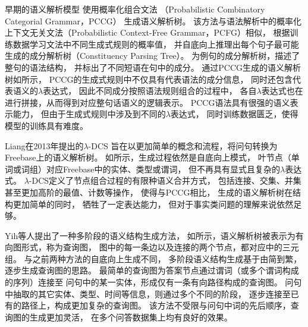早期的语义解析模型\cite{zettlemoyer2012learning,kwiatkowski2010inducing,cai2013large}
使用概率化组合文法  （Probabilistic Combinatory Categorial Grammar，PCCG）
生成语义解析树。
该方法与语法解析中的概率化上下文无关文法（Probabilistic Context-Free Grammar，PCFG）相似，
根据训练数据学习文法中不同生成式规则的概率值，
并自底向上推理出每个句子最可能生成的成分解析树（Constituency Parsing Tree）。
为例句的成分解析树，描述了整句的语法结构，
并标出了不同短语在句中的成分。
通过PCCG生成的语义解析树如所示，
PCCG的生成式规则中不仅具有代表语法的成分信息，
同时还包含代表语义的$\lambda$表达式，
因此不同成分按照语法规则组合的过程中，
各自$\lambda$表达式也在进行拼接，从而得到对应整句话语义的逻辑表示。
PCCG语法具有很强的语义表示能力，
但由于生成式规则中涉及到不同的$\lambda$表达式，
同时训练数据匮乏，使得模型的训练具有难度。

% 


Liang在2013年提出的$\lambda$-DCS\cite{liang2013lambda}
旨在以更加简单的概念和流程，将问句转换为Freebase上的语义解析树。
如所示，生成过程依然是自底向上模式，
叶节点（单词或词组）对应Freebase中的实体、类型或谓词，
但不再具有显式且复杂的$\lambda$表达式。
$\lambda$-DCS定义了节点组合过程的有限种语义合并方式，
包括连接、交集、并集甚至更加高阶的最值、计数等操作，
使得与PCCG相比，
生成的语义解析树在结构更加简单的同时，
牺牲了一定表达能力，
但对于事实类问题的理解来说依然足够。

Yih等人\cite{yih2015semantic}提出了一种多阶段的语义结构生成方法，
如所示，语义解析树被表示为有向图形式，称为查询图，
图中的每一条边以及连接的两个节点，都对应中的三元组。
与之前两种方法的自底向上生成不同，
多阶段语义结构生成基于由简到繁，逐步生成查询图的思路。
最简单的查询图为答案节点通过谓词（或多个谓词构成的序列）连接至
问句中的某一实体，形成仅有一条有向路径构成的查询图。
问句中抽取的其它实体、类型、时间等信息，则通过多个不同的阶段，
逐步连接至已有的路径上，构成更加复杂的查询图。
该方法不受限与问句中词的先后顺序，查询图的生成更加灵活，
在多个问答数据集上均有良好的效果。

